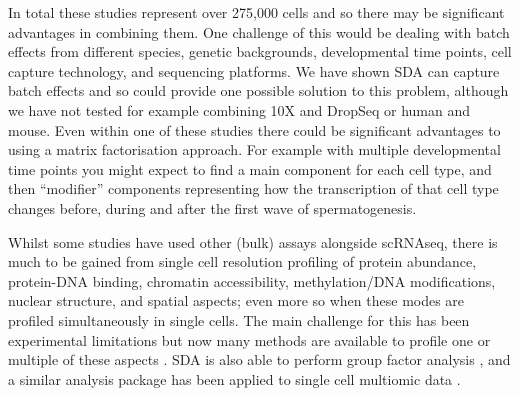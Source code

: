 In total these studies represent over 275,000 cells and so there may be significant advantages in combining them. One challenge of this would be dealing with batch effects from different species, genetic backgrounds, developmental time points, cell capture technology, and sequencing platforms. We have shown SDA can capture batch effects and so could provide one possible solution to this problem, although we have not tested for example combining 10X and DropSeq or human and mouse. Even within one of these studies there could be significant advantages to using a matrix factorisation approach. For example with multiple developmental time points you might expect to find a main component for each cell type, and then ``modifier'' components representing how the transcription of that cell type changes before, during and after the first wave of spermatogenesis.

Whilst some studies \parencite{Ernst2019Staged} have used other (bulk) assays alongside scRNAseq, there is much to be gained from single cell resolution profiling of protein abundance, protein-DNA binding, chromatin accessibility, methylation/DNA modifications, nuclear structure, and spatial aspects; even more so when these modes are profiled simultaneously in single cells. The main challenge for this has been experimental limitations but now many methods are available to profile one or multiple of these aspects \parencite[reviewed in][]{Chappell2018SingleCell, Hu2018Single, Stuart2019Integrative, Heriche2019Integrating}. SDA is also able to perform group factor analysis \parencite{Hore2015Latent}, and a similar analysis package has been applied to single cell multiomic data \parencite{Argelaguet2019Multiomics}.

